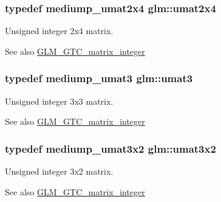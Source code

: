 \subsubsection[{umat2x4}]{\setlength{\rightskip}{0pt plus 5cm}typedef mediump\+\_\+umat2x4 {\bf glm\+::umat2x4}}\label{group__gtc__matrix__integer_ga3b23b164240cf4dfb429776da7be9d88}
Unsigned integer 2x4 matrix. \begin{DoxySeeAlso}{See also}
\hyperlink{group__gtc__matrix__integer}{G\+L\+M\+\_\+\+G\+T\+C\+\_\+matrix\+\_\+integer} 
\end{DoxySeeAlso}
\hypertarget{group__gtc__matrix__integer_ga8b8fbc858e28abf8fc344744f8d6d368}{}
\subsubsection[{umat3}]{\setlength{\rightskip}{0pt plus 5cm}typedef mediump\+\_\+umat3 {\bf glm\+::umat3}}\label{group__gtc__matrix__integer_ga8b8fbc858e28abf8fc344744f8d6d368}
Unsigned integer 3x3 matrix. \begin{DoxySeeAlso}{See also}
\hyperlink{group__gtc__matrix__integer}{G\+L\+M\+\_\+\+G\+T\+C\+\_\+matrix\+\_\+integer} 
\end{DoxySeeAlso}
\hypertarget{group__gtc__matrix__integer_ga257300f2710612877ef45438a366e308}{}
\subsubsection[{umat3x2}]{\setlength{\rightskip}{0pt plus 5cm}typedef mediump\+\_\+umat3x2 {\bf glm\+::umat3x2}}\label{group__gtc__matrix__integer_ga257300f2710612877ef45438a366e308}
Unsigned integer 3x2 matrix. \begin{DoxySeeAlso}{See also}
\hyperlink{group__gtc__matrix__integer}{G\+L\+M\+\_\+\+G\+T\+C\+\_\+matrix\+\_\+integer} 
\end{DoxySeeAlso}
\hypertarget{group__gtc__matrix__integer_gab80b6501ba1b2c40119a0f2d256f4c97}{}
